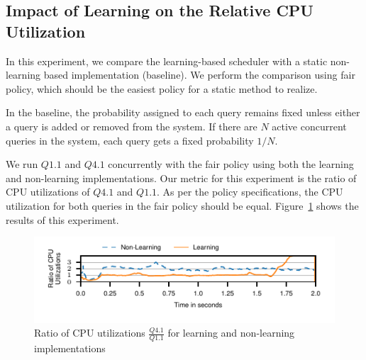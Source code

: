 \subsection{Impact of Learning on the Relative CPU Utilization}\label{ssec:learning-impact-cpu-util}
In this experiment, we compare the learning-based scheduler with a static non-learning based implementation (baseline).
We perform the comparison using fair policy, which should be the easiest policy for a static method to realize.

In the baseline, the probability assigned to each query remains fixed unless either a query is added or removed from the system.
If there are $N$ active concurrent queries in the system, each query gets a fixed probability $1/N$.

We run $Q1.1$ and $Q4.1$ concurrently with the fair policy using both the learning and 
non-learning implementations.
Our metric for this experiment is the ratio of CPU utilizations of $Q4.1$ and $Q1.1$.
As per the policy specifications, the CPU utilization for both queries in the fair policy 
should be equal. %
Figure~\ref{fig:non-learning-comparison} shows the results of this experiment.

\begin{figure}[h]
	\centering
	\includegraphics[width=\columnwidth]{policy/figures/q1-q11-ratio-cpu-util.pdf}
	\caption{Ratio of CPU utilizations  $\frac{Q4.1}{Q1.1}$ for learning and non-learning 
		implementations}
	\label{fig:non-learning-comparison}
\end{figure}

